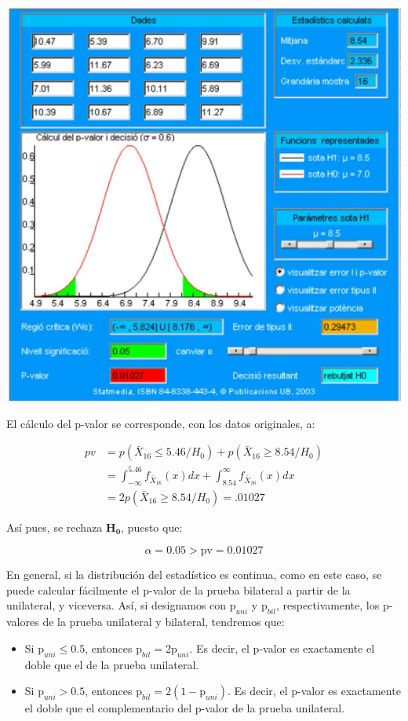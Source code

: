 \documentclass[
]{article}
\providecommand{\tightlist}{%
  \setlength{\itemsep}{0pt}\setlength{\parskip}{0pt}}
\begin{document}
\begin{center}\includegraphics[width=0.9\linewidth]{images/cap9-CalculPvalorBilateral} \end{center}

El cálculo del p-valor se corresponde, con los datos originales, a:

\[
\begin{aligned}
p v & =p\left(\bar{X}_{16} \leq 5.46 / H_{0}\right)+p\left(\bar{X}_{16} \geq 8.54 / H_{0}\right) \\
& =\int_{-\infty}^{5.46} f_{\bar{X}_{16}}(x) d x+\int_{8.54}^{\infty} f_{\bar{X}_{16}}(x) d x \\
& =2 p\left(\bar{X}_{16} \geq 8.54 / H_{0}\right)=.01027
\end{aligned}
\]

Así pues, se rechaza \(\mathbf{H}_{\mathbf{0}}\), puesto que:

\[
\alpha=0.05>\mathrm{pv}=0.01027
\]

En general, si la distribución del estadístico es continua, como en este caso, se puede calcular fácilmente el p-valor de la prueba bilateral a partir de la unilateral, y viceversa. Así, si designamos con \(\mathrm{p}_{uni}\) y \(\mathrm{p}_{bil}\), respectivamente, los p-valores de la prueba unilateral y bilateral, tendremos que:

\begin{itemize}
\tightlist
\item
  Si \(\mathrm{p}_{uni} \leq 0.5\), entonces \(\mathrm{p}_{bil}=2 \mathrm{p}_{uni}\). Es decir, el p-valor es exactamente el doble que el de la prueba unilateral.
\item
  Si \(\mathrm{p}_{uni}>0.5\), entonces \(\mathrm{p}_{bil}=2(1-\mathrm{p}_{uni})\). Es decir, el p-valor es exactamente el doble que el complementario del p-valor de la prueba unilateral.
\end{itemize}
\end{document}
